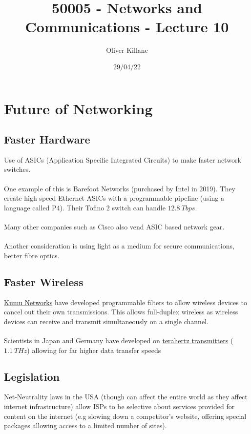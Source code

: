 \documentclass{report}
\title{50005 - Networks and Communications - Lecture 10}
\author{Oliver Killane}
\date{29/04/22}
\begin{document}
\maketitle
{}

\section*{Future of Networking}

\subsection*{Faster Hardware}
Use of ASICs (Application Specific Integrated Circuits) to make faster network switches.
\\
\\ One example of this is Barefoot Networks (purchased by Intel in 2019). They 
create high speed Ethernet ASICs with a programmable pipeline (using a language called P4).
Their Tofino 2 switch can handle $12.8 \ Tbps$.
\\
\\ Many other companies such as Cisco also vend ASIC based network gear.
\\
\\ Another consideration is using light as a medium for secure communications, better fibre optics.

\subsection*{Faster Wireless}
\href{https://kumunetworks.com/}{Kumu Networks} have developed programmable filters to 
allow wireless devices to cancel out their own transmissions. This allows full-duplex 
wireless as wireless devices can receive and transmit simultaneously on a single channel.
\\
\\ Scientists in Japan and Germany have developed on \href{https://spectrum.ieee.org/recordsetting-terahertz-transmitters}{terahertz transmitters} ($1.1 \ THz$) allowing for far higher data transfer speeds

\subsection*{Legislation}
Net-Neutrality laws in the USA (though can affect the entire world as they affect internet infrastructure) allow ISPs 
to be selective about services provided for content on the internet (e.g slowing down a competitor's website, 
offering special packages allowing access to a limited number of sites).
\end{document}
